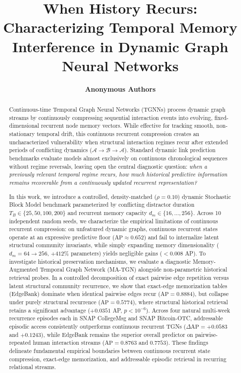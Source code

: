 \documentclass[10pt,twocolumn,letterpaper]{article}
\title{\textbf{When History Recurs: Characterizing Temporal Memory Interference in Dynamic Graph Neural Networks}}
\author[1]{\textbf{Anonymous Authors}}
\affil[1]{Empirical Temporal Graph Learning Working Group}
\date{}
\begin{document}
\maketitle

\begin{abstract}
Continuous-time Temporal Graph Neural Networks (TGNNs) process dynamic graph streams by continuously compressing sequential interaction events into evolving, fixed-dimensional recurrent node memory vectors. While effective for tracking smooth, non-stationary temporal drift, this continuous recurrent compression creates an uncharacterized vulnerability when structural interaction regimes recur after extended periods of conflicting dynamics ($\mathcal{A} \to \mathcal{B} \to \mathcal{A}$). Standard dynamic link prediction benchmarks evaluate models almost exclusively on continuous chronological sequences without regime reversals, leaving open the central diagnostic question: \textit{when a previously relevant temporal regime recurs, how much historical predictive information remains recoverable from a continuously updated recurrent representation?}

In this work, we introduce a controlled, density-matched ($\rho = 0.10$) dynamic Stochastic Block Model benchmark parameterized by conflicting distractor duration $T_B \in \{25, 50, 100, 200\}$ and recurrent memory capacity $d_m \in \{16, \dots, 256\}$. Across 10 independent random seeds, we characterize the empirical limitations of continuous recurrent compression: on unfeatured dynamic graphs, continuous recurrent states operate at an expressive predictive floor ($\text{AP} \approx 0.652$) and fail to internalize latent structural community invariants, while simply expanding memory dimensionality ($d_m = 64 \to 256$, $+412\%$ parameters) yields negligible gains ($<0.008$ AP). To investigate historical preservation mechanisms, we evaluate a diagnostic Memory-Augmented Temporal Graph Network (MA-TGN) alongside non-parametric historical retrieval probes. In a controlled decomposition of exact pairwise edge repetition versus latent structural community recurrence, we show that exact-edge memorization tables (EdgeBank) dominate when identical pairwise edges recur ($\text{AP} = 0.8884$), but collapse under purely structural recurrence ($\text{AP} = 0.5774$), where structural historical retrieval retains a significant advantage ($+0.0351$ AP, $p < 10^{-6}$). Across four natural multi-week recurrence episodes each in SNAP CollegeMsg and SNAP Bitcoin-OTC, addressable episodic access consistently outperforms continuous recurrent TGNs ($\Delta\text{AP} = +0.0583$ and $+0.1243$), while EdgeBank remains the superior overall predictor on pairwise-repeated human interaction streams ($\text{AP} = 0.8763$ and $0.7753$). These findings delineate fundamental empirical boundaries between continuous recurrent state compression, exact-edge memorization, and addressable episodic retrieval in recurring relational streams.
\end{abstract}
\end{document}
